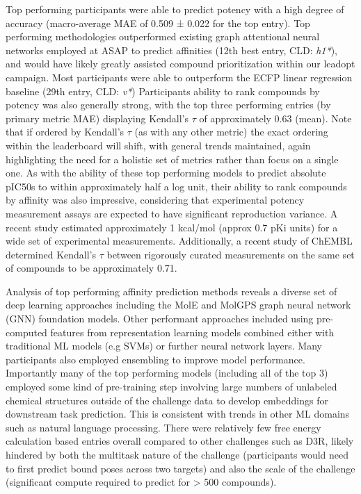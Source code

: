 \documentclass[journal=jcim,manuscript=article]{achemso}
\begin{document}
Top performing participants were able to predict potency with a high degree of accuracy (macro-average MAE of 0.509 ± 0.022 for the top entry). Top performing methodologies outperformed existing graph attentional neural networks employed at ASAP to predict affinities (12th best entry, CLD: \textit{h1*}), and would have likely greatly assisted compound prioritization within our leadopt campaign. Most participants were able to outperform the ECFP linear regression baseline (29th entry, CLD: \textit{v*}) Participants ability to rank compounds by potency was also generally strong, with the top three performing entries (by primary metric MAE) displaying Kendall's $\tau$ of approximately 0.63 (mean). Note that if ordered by Kendall's $\tau$ (as with any other metric) the exact ordering within the leaderboard will shift, with general trends maintained, again highlighting the need for a holistic set of metrics rather than focus on a single one. As with the ability of these top performing models to predict absolute pIC50s to within approximately half a log unit, their ability to rank compounds by affinity was also impressive, considering that experimental potency measurement assays are expected to have significant reproduction variance. A recent study estimated approximately 1 kcal/mol (approx 0.7 pKi units)\cite{ross_maximal_2023} for a wide set of experimental measurements. Additionally, a recent study of ChEMBL\cite{landrum_combining_2024} determined Kendall's $\tau$ between rigorously curated measurements on the same set of compounds to be approximately 0.71.

Analysis of top performing affinity prediction methods reveals a diverse set of deep learning approaches including the MolE\cite{mendez-lucio_mole_2024} and MolGPS\cite{sypetkowski2024scalabilitygnnsmoleculargraphs} graph neural network (GNN) foundation models. Other performant approaches included using pre-computed features from representation learning models combined either with traditional ML models (e.g SVMs) or further neural network layers. Many participants also employed ensembling to improve model performance.  Importantly many of the top performing models (including all of the top 3) employed some kind of pre-training step involving large numbers of unlabeled chemical structures outside of the challenge data to develop embeddings for downstream task prediction. This is consistent with trends in other ML domains such as natural language processing\cite{radford2019language}. There were relatively few free energy calculation based entries overall compared to other challenges such as D3R\cite{parks_gaieb_chiu_yang_shao_walters_jansen_mcgaughey_lewis_bembenek_et}, likely hindered by both the multitask nature of the challenge (participants would need to first predict bound poses across two targets) and also the scale of the challenge (significant compute required to predict for > 500 compounds).
\end{document}
